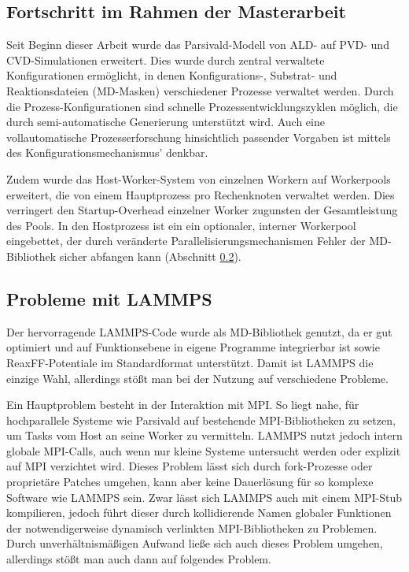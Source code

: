\subsection{Fortschritt im Rahmen der Masterarbeit}

Seit Beginn dieser Arbeit wurde das Parsivald-Modell von ALD- auf PVD- und CVD-Simu\-lationen erweitert.
Dies wurde durch zentral verwaltete Konfigurationen ermöglicht, in denen Konfigurations-, Substrat- und Reaktionsdateien (MD-Masken) verschiedener Prozesse verwaltet werden.
Durch die Prozess-Konfigurationen sind schnelle Prozessentwicklungszyklen möglich, die durch semi-automatische Generierung unterstützt wird.
Auch eine vollautomatische Prozesserforschung hinsichtlich passender Vorgaben ist mittels des Konfigurationsmechanismus' denkbar.

Zudem wurde das Host-Worker-System von einzelnen Workern auf Workerpools erweitert, die von einem Hauptprozess pro Rechenknoten verwaltet werden.
Dies verringert den Startup-Overhead einzelner Worker zugunsten der Gesamtleistung des Pools.
In den Hostprozess ist ein ein optionaler, interner Workerpool eingebettet, der durch veränderte Parallelisierungsmechanismen Fehler der MD-Bibliothek sicher abfangen kann (Abschnitt \ref{lammpssucks}).


\subsection{Probleme mit LAMMPS}
\label{lammpssucks}

Der hervorragende LAMMPS-Code wurde als MD-Bibliothek genutzt, da er gut optimiert und auf Funktionsebene in eigene Programme integrierbar ist sowie ReaxFF-Potentiale im Standardformat unterstützt.
Damit ist LAMMPS die einzige Wahl, allerdings stößt man bei der Nutzung auf verschiedene Probleme.

Ein Hauptproblem besteht in der Interaktion mit MPI.
So liegt nahe, für hochparallele Systeme wie Parsivald auf bestehende MPI-Bibliotheken zu setzen, um Tasks vom Host an seine Worker zu vermitteln.
LAMMPS nutzt jedoch intern globale MPI-Calls, auch wenn nur kleine Systeme untersucht werden oder explizit auf MPI verzichtet wird.
Dieses Problem lässt sich durch fork-Prozesse oder proprietäre Patches umgehen, kann aber keine Dauerlösung für so komplexe Software wie LAMMPS sein.
Zwar lässt sich LAMMPS auch mit einem MPI-Stub kompilieren, jedoch führt dieser durch kollidierende Namen globaler Funktionen der notwendigerweise dynamisch verlinkten MPI-Bibliotheken zu Problemen.
Durch unverhältnismäßigen Aufwand ließe sich auch dieses Problem umgehen, allerdings stößt man auch dann auf folgendes Problem.

